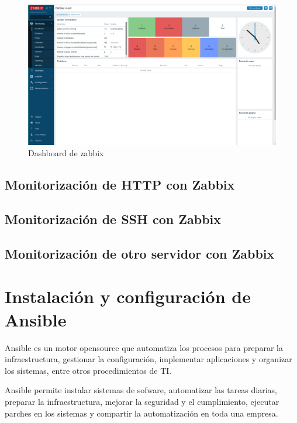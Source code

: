 \begin{figure}[H]
	\centering
	\includegraphics[scale=0.28]{graphics/img12}
	\caption{Dashboard de zabbix}
\end{figure}

\newpage
\subsection{Monitorización de HTTP con Zabbix}



\newpage
\subsection{Monitorización de SSH con Zabbix}

\newpage
\subsection{Monitorización de otro servidor con Zabbix}
 
\newpage
\section{Instalación y configuración de Ansible}
Ansible es un motor opensource que automatiza los procesos para preparar la infraestructura, gestionar la configuración, implementar aplicaciones y organizar los sistemas, entre otros procedimientos de TI.

Ansible permite instalar sistemas de sofware, automatizar las tareas diarias, preparar la infraestructura, mejorar la seguridad y el cumplimiento, ejecutar parches en los sistemas y compartir la automatización en toda una empresa.

